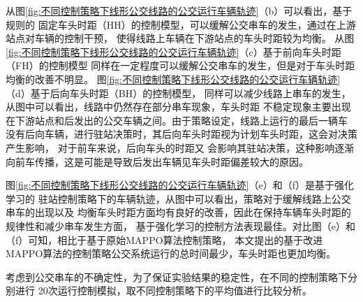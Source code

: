 从图\ref{fig:不同控制策略下线形公交线路的公交运行车辆轨迹}（b）可以看出，基于规则的
固定车头时距（HH）的控制模型，可以缓解公交串车的发生，通过在上游站点对车辆的控制干预，
使得线路上车辆在下游站点的车头时距较为均衡。
从图\ref{fig:不同控制策略下线形公交线路的公交运行车辆轨迹}（c）基于前向车头时距（FH）的控制模型
同样在一定程度可以缓解公交串车的发生，但是对于车头时距均衡的改善不明显。
图\ref{fig:不同控制策略下线形公交线路的公交运行车辆轨迹}（d）基于后向车头时距（BH）的控制模型，
同样可以减少线路上串车的发生，从图中可以看出，线路中仍然存在部分串车现象，车头时距
不稳定现象主要出现在下游站点和后发出的公交车辆之间。由于策略设定，线路上运行的最后一辆车
没有后向车辆，进行驻站决策时，其后向车头时距视为计划车头时距，这会对决策产生影响，
对于前车来说，后向车头的时距又
会影响其驻站决策，这种影响逐渐向前车传播，这是可能是导致后发出车辆见车头时距偏差较大的原因。

图\ref{fig:不同控制策略下线形公交线路的公交运行车辆轨迹}（e）和（f）是基于强化学习的
驻站控制策略下的车辆轨迹，从图中可以看出，策略对于缓解线路上公交串车的出现以及
均衡车头时距方面均有良好的改善，因此在保持车辆车头时距的规律性和减少串车发生方面，
基于强化学习的控制方法表现最佳。对比图（e）和（f）可知，相比于基于原始MAPPO算法控制策略，
本文提出的基于改进MAPPO算法的控制策略公交系统运行的总时间最少，车头时距也更加均衡。


考虑到公交串车的不确定性，为了保证实验结果的稳定性，在不同的控制策略下分别进行
20次运行控制模拟，取不同控制策略下的平均值进行比较分析。


